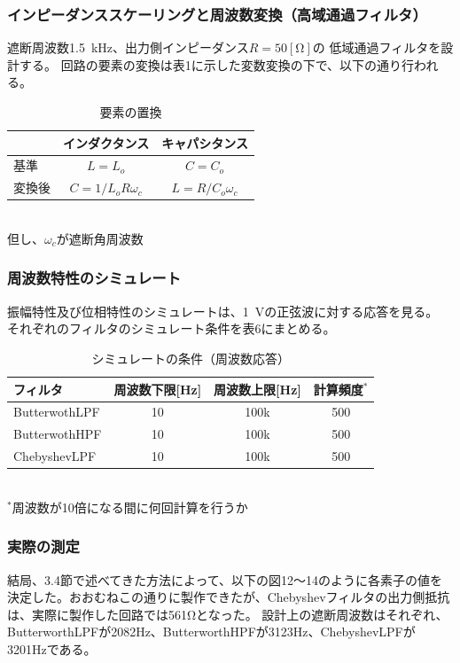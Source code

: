 \documentclass[10pt,a4j,dvipdfmx]{jsarticle}
\begin{document}
\subsubsection{インピーダンススケーリングと周波数変換（高域通過フィルタ）}
遮断周波数\SI{1.5}{\kilo\hertz}、出力側インピーダンス$R = 50[\si{\ohm}]$の
低域通過フィルタを設計する。
回路の要素の変換は表1に示した変数変換の下で、以下の通り行われる。

\begin{table}[htb]
  \begin{center}
    \caption{要素の置換}
    \begin{tabular}{|l||c|c|} \hline
       & インダクタンス & キャパシタンス\\ \hline \hline
      基準 & $L=L_o$ & $C=C_o$ \\
      変換後 & $C=1/L_oR\omega_c$ & $L=R/C_o\omega_c$ \\ \hline
    \end{tabular}
    \\ 但し、$\omega_c$が遮断角周波数
  \end{center}
\end{table}

\subsubsection{周波数特性のシミュレート}
振幅特性及び位相特性のシミュレートは、\SI{1}{\volt}の正弦波に対する応答を見る。
それぞれのフィルタのシミュレート条件を表6にまとめる。

\begin{table}[H]
  \begin{center}
    \caption{シミュレートの条件（周波数応答）}
    \begin{tabular}{|l||c|c|c|} \hline
      フィルタ & 周波数下限[\si{\hertz}] & 周波数上限[\si{\hertz}] & 計算頻度$^*$\\ \hline \hline
      ButterwothLPF & 10 & 100k & 500\\
      ButterwothHPF & 10 & 100k & 500 \\ 
      ChebyshevLPF & 10 & 100k & 500 \\ 
      \hline
    \end{tabular}
    \\ $^*$周波数が10倍になる間に何回計算を行うか
  \end{center}
\end{table}

\subsubsection{実際の測定}
結局、3.4節で述べてきた方法によって、以下の図12〜14のように各素子の値を決定した。おおむねこの通りに製作できたが、Chebyshevフィルタの出力側抵抗は、実際に製作した回路では561\si{\ohm}となった。
設計上の遮断周波数はそれぞれ、ButterworthLPFが2082Hz、ButterworthHPFが3123Hz、ChebyshevLPFが3201Hzである。
\end{document}
